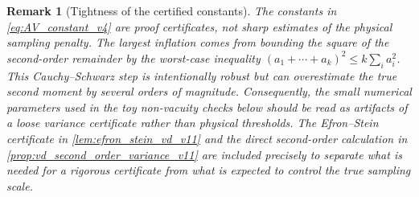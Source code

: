 \documentclass[11pt]{article}
\newtheorem{remark}{Remark}
\newcommand{\1}{\mathbf{1}}
\begin{document}
\begin{remark}[Tightness of the certified constants]
\label{rem:constant_tightness_v7}
The constants in \cref{eq:AV_constant_v4} are proof certificates, not sharp estimates of the physical sampling penalty.  The largest inflation comes from bounding the square of the second-order remainder by the worst-case inequality \((a_1+\cdots+a_k)^2\le k\sum_i a_i^2\).  This Cauchy--Schwarz step is intentionally robust but can overestimate the true second moment by several orders of magnitude.  Consequently, the small numerical parameters used in the toy non-vacuity checks below should be read as artifacts of a loose variance certificate rather than physical thresholds.  The Efron--Stein certificate in \cref{lem:efron_stein_vd_v11} and the direct second-order calculation in \cref{prop:vd_second_order_variance_v11} are included precisely to separate what is needed for a rigorous certificate from what is expected to control the true sampling scale.
\end{remark}
\end{document}
